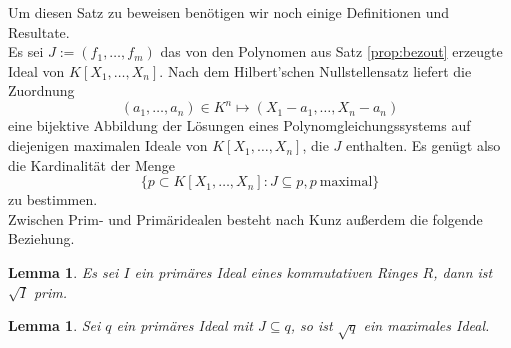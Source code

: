 \documentclass[a4paper,oneside, 11pt, openany%
]{article}
\newcommand{\coloneqq}{:=}
\theoremstyle{custom}
\newtheorem{lemma}[theorem]{Lemma}
\theoremstyle{custom}
\begin{document}
	Um diesen Satz zu beweisen benötigen wir noch einige Definitionen und Resultate.\\
	Es sei $J \coloneqq (f_1,\ldots,f_m)$ das von den Polynomen aus Satz \ref{prop:bezout} erzeugte Ideal von $K[X_1,\ldots,X_n]$.
	Nach dem Hilbert'schen Nullstellensatz liefert die Zuordnung
	\begin{equation*}
		(a_1,\ldots,a_n) \in K^n \mapsto (X_1 - a_1, \ldots,X_n - a_n)
	\end{equation*}
	eine bijektive Abbildung der Lösungen eines Polynomgleichungssystems auf diejenigen maximalen Ideale von $K[X_1,\ldots,X_n]$, die $J$ enthalten. Es genügt also die Kardinalität der Menge
	\begin{equation*}
		\{p \subset K[X_1,\ldots,X_n] \colon J \subseteq p, p \ \text{maximal}\}
	\end{equation*}
	zu bestimmen.\\
	Zwischen Prim- und Primäridealen besteht nach Kunz \cite{kunz2013} außerdem die folgende Beziehung.
	\begin{lemma}\label{cor:prim_max}
		Es sei $I$ ein primäres Ideal eines kommutativen Ringes $R$, dann ist $\sqrt{I}$ prim.
	\end{lemma}

	\begin{lemma}
		Sei $q$ ein primäres Ideal mit $J \subseteq q$, so ist $\sqrt{q}$ ein maximales Ideal.
	\end{lemma}
	
\end{document}
